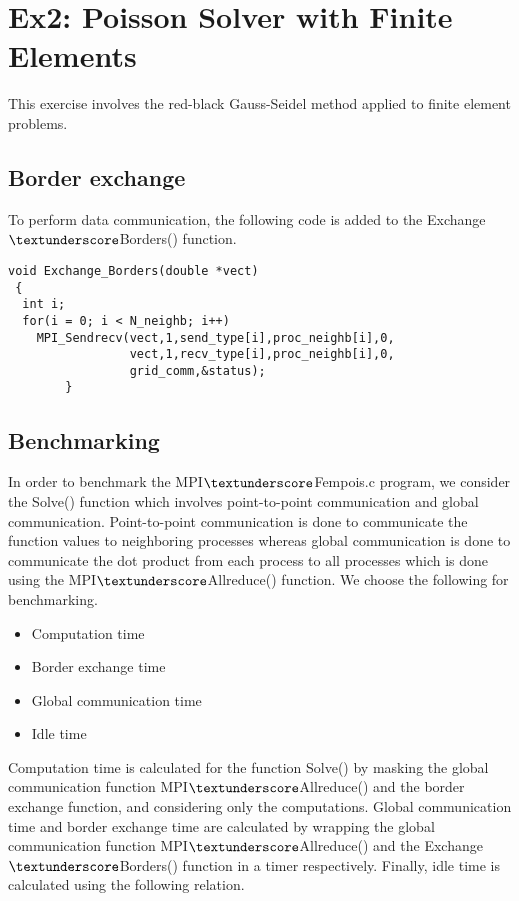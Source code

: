 \section{Ex2: Poisson Solver with Finite Elements}
This exercise involves the red-black Gauss-Seidel method applied to finite element problems. 
\subsection{Border exchange}
To perform data communication, the following code is added to the Exchange$ \textunderscore $Borders() function. \\

\begin{lstlisting}[style=CStyle]
 void Exchange_Borders(double *vect)
 {
  int i;
  for(i = 0; i < N_neighb; i++)
    MPI_Sendrecv(vect,1,send_type[i],proc_neighb[i],0,
                 vect,1,recv_type[i],proc_neighb[i],0,
                 grid_comm,&status);
		}
\end{lstlisting}
              
\subsection{Benchmarking}
In order to benchmark the MPI$ \textunderscore $Fempois.c program, we consider the Solve() function which involves point-to-point communication and global communication. Point-to-point communication is done to communicate the function values to neighboring processes whereas global communication is done to communicate the dot product from each process to all processes which is done using the MPI$ \textunderscore $Allreduce() function. We choose the following for benchmarking. 
              
\begin{itemize}
\item Computation time
\item Border exchange time
\item Global communication time
\item Idle time
\end{itemize}

Computation time is calculated for the function Solve() by masking the global communication function MPI$ \textunderscore $Allreduce() and the border exchange function, and considering only the computations. Global communication time and border exchange time are calculated by wrapping the global communication function MPI$ \textunderscore $Allreduce() and the Exchange$ \textunderscore $Borders() function in a timer respectively. Finally, idle time is calculated using the following relation.

